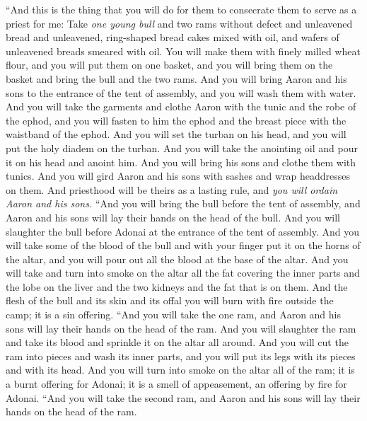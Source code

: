\begin{biblechapter} %
 “And this is the thing that you will do for them to consecrate them to serve as a priest for me: Take \textit{one young bull} and two rams without defect
\verse and unleavened bread and unleavened, ring-shaped bread cakes mixed with oil, and wafers of unleavened breads smeared with oil. You will make them with finely milled wheat flour,
\verse and you will put them on one basket, and you will bring them on the basket and bring the bull and the two rams.
\verse And you will bring Aaron and his sons to the entrance of the tent of assembly, and you will wash them with water.
\verse And you will take the garments and clothe Aaron with the tunic and the robe of the ephod, and you will fasten to him the ephod and the breast piece with the waistband of the ephod.
\verse And you will set the turban on his head, and you will put the holy diadem on the turban.
\verse And you will take the anointing oil and pour it on his head and anoint him.
\verse And you will bring his sons and clothe them with tunics.
\verse And you will gird Aaron and his sons with sashes and wrap headdresses on them. And priesthood will be theirs as a lasting rule, and \textit{you will ordain Aaron and his sons.}
\verse “And you will bring the bull before the tent of assembly, and Aaron and his sons will lay their hands on the head of the bull.
\verse And you will slaughter the bull before Adonai at the entrance of the tent of assembly.
\verse And you will take some of the blood of the bull and with your finger put it on the horns of the altar, and you will pour out all the blood at the base of the altar.
\verse And you will take and turn into smoke on the altar all the fat covering the inner parts and the lobe on the liver and the two kidneys and the fat that is on them.
\verse And the flesh of the bull and its skin and its offal you will burn with fire outside the camp; it is a sin offering.
\verse “And you will take the one ram, and Aaron and his sons will lay their hands on the head of the ram.
\verse And you will slaughter the ram and take its blood and sprinkle it on the altar all around.
\verse And you will cut the ram into pieces and wash its inner parts, and you will put its legs with its pieces and with its head.
\verse And you will turn into smoke on the altar all of the ram; it is a burnt offering for Adonai; it is a smell of appeasement, an offering by fire for Adonai.
\verse “And you will take the second ram, and Aaron and his sons will lay their hands on the head of the ram.

\end{biblechapter}
